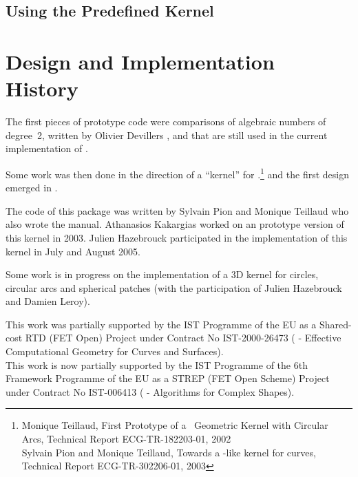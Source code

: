 
	\subsection{Using the Predefined Kernel} 


\section{Design and Implementation History}

The first pieces of prototype code were comparisons of algebraic
numbers of degree~2, written by Olivier Devillers
\cite{cgal:dfmt-amafe-00,cgal:dfmt-amafe-02}, and that are still used
in the current implementation of .

Some work was then done in the direction of a ``kernel'' for
\cgal.\footnote{Monique Teillaud, First Prototype of a
\cgal\ Geometric Kernel with Circular Arcs, Technical Report
ECG-TR-182203-01, 2002\\Sylvain Pion and Monique Teillaud,
Towards a \cgal-like kernel for curves, Technical Report
ECG-TR-302206-01, 2003} and the first design emerged in
\cite{cgal:ekptt-tock-04}.

The code of this package was written by Sylvain Pion and Monique
Teillaud who also wrote the manual. Athanasios Kakargias worked on an
prototype version of this kernel in 2003. Julien Hazebrouck
participated in the implementation of this kernel in July and August
2005.

Some work is in progress on the implementation of a 3D kernel for
circles, circular arcs and spherical patches (with the participation
of Julien Hazebrouck and Damien Leroy).

This work was partially supported by the IST Programme of the EU as a
Shared-cost RTD (FET Open) Project under Contract No IST-2000-26473
( - Effective
Computational Geometry for Curves and Surfaces).\\
This work is now partially supported by the IST Programme of the 6th
Framework Programme of the EU as a STREP (FET Open Scheme) Project
under Contract No IST-006413 ( -
Algorithms for Complex Shapes).
